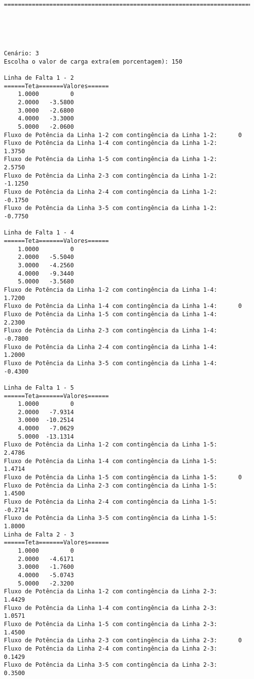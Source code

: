 \begin{verbatim}
=======================================================================





Cenário: 3
Escolha o valor de carga extra(em porcentagem): 150

Linha de Falta 1 - 2
======Teta=======Valores======
    1.0000         0
    2.0000   -3.5800
    3.0000   -2.6800
    4.0000   -3.3000
    5.0000   -2.0600
Fluxo de Potência da Linha 1-2 com contingência da Linha 1-2:      0
Fluxo de Potência da Linha 1-4 com contingência da Linha 1-2:     1.3750
Fluxo de Potência da Linha 1-5 com contingência da Linha 1-2:     2.5750
Fluxo de Potência da Linha 2-3 com contingência da Linha 1-2:    -1.1250
Fluxo de Potência da Linha 2-4 com contingência da Linha 1-2:    -0.1750
Fluxo de Potência da Linha 3-5 com contingência da Linha 1-2:    -0.7750

Linha de Falta 1 - 4
======Teta=======Valores======
    1.0000         0
    2.0000   -5.5040
    3.0000   -4.2560
    4.0000   -9.3440
    5.0000   -3.5680
Fluxo de Potência da Linha 1-2 com contingência da Linha 1-4:     1.7200
Fluxo de Potência da Linha 1-4 com contingência da Linha 1-4:      0
Fluxo de Potência da Linha 1-5 com contingência da Linha 1-4:     2.2300
Fluxo de Potência da Linha 2-3 com contingência da Linha 1-4:    -0.7800
Fluxo de Potência da Linha 2-4 com contingência da Linha 1-4:     1.2000
Fluxo de Potência da Linha 3-5 com contingência da Linha 1-4:    -0.4300

Linha de Falta 1 - 5
======Teta=======Valores======
    1.0000         0
    2.0000   -7.9314
    3.0000  -10.2514
    4.0000   -7.0629
    5.0000  -13.1314
Fluxo de Potência da Linha 1-2 com contingência da Linha 1-5:     2.4786
Fluxo de Potência da Linha 1-4 com contingência da Linha 1-5:     1.4714
Fluxo de Potência da Linha 1-5 com contingência da Linha 1-5:      0
Fluxo de Potência da Linha 2-3 com contingência da Linha 1-5:     1.4500
Fluxo de Potência da Linha 2-4 com contingência da Linha 1-5:    -0.2714
Fluxo de Potência da Linha 3-5 com contingência da Linha 1-5:     1.8000
Linha de Falta 2 - 3
======Teta=======Valores======
    1.0000         0
    2.0000   -4.6171
    3.0000   -1.7600
    4.0000   -5.0743
    5.0000   -2.3200
Fluxo de Potência da Linha 1-2 com contingência da Linha 2-3:     1.4429
Fluxo de Potência da Linha 1-4 com contingência da Linha 2-3:     1.0571
Fluxo de Potência da Linha 1-5 com contingência da Linha 2-3:     1.4500
Fluxo de Potência da Linha 2-3 com contingência da Linha 2-3:      0
Fluxo de Potência da Linha 2-4 com contingência da Linha 2-3:     0.1429
Fluxo de Potência da Linha 3-5 com contingência da Linha 2-3:     0.3500


\end{verbatim}
